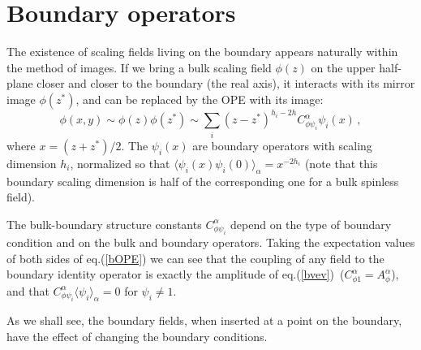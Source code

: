 \documentclass[a4paper,12pt]{report}
\begin{document}
\vspace{1cm}


\section{Boundary operators}

The existence of scaling fields living on the boundary appears naturally within the method of images. If we bring
a bulk scaling field $\phi(z)$ on the upper half-plane closer and closer to the boundary (the real axis), it
interacts with its mirror image $\phi(z^{*})$, and can be replaced by the OPE with its image:
\begin{equation}\label{bOPE}
\phi(x,y)\sim\phi(z)\phi(z^{*})\sim\sum_{i}(z-z^{*})^{h_{i}-2h}C_{\phi\psi_{i}}^{\alpha}\psi_{i}(x)\,,
\end{equation}
where $x=(z+z^{*})/2$. The $\psi_{i}(x)$ are boundary operators with scaling dimension $h_{i}$, normalized so
that $\langle\psi_{i}(x)\psi_{i}(0)\rangle_{\alpha}=x^{-2h_{i}}$ (note that this boundary scaling dimension is
half of the corresponding one for a bulk spinless field).

The bulk-boundary structure constants $C_{\phi\psi_{i}}^{\alpha}$ depend on the type of boundary condition and on
the bulk and boundary operators. Taking the expectation values of both sides of eq.(\ref{bOPE}) we can see that
the coupling of any field to the boundary identity operator is exactly the amplitude of eq.(\ref{bvev})\,
($C_{\phi 1}^{\alpha}=A_{\phi}^{\alpha}$), and that $C_{\phi\psi _{i}}^{\alpha}\langle\psi _{i} \rangle
_{\alpha}=0$ for $\psi _{i}\neq 1$.

As we shall see, the boundary fields, when inserted at a point on the boundary, have the effect of changing the
boundary conditions.

\vspace{2cm}
\end{document}
